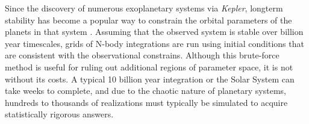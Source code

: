 \documentclass[12pt,letter]{aastex}
\newcommand{\kep}{{\it Kepler}\xspace}
\begin{document}
Since the discovery of numerous exoplanetary systems via \kep, longterm stability has become a popular way to constrain the orbital parameters of the planets in that system \citep{Lissauer2011, Steffen2013, Jontof-Hutter2014, Tamayo2015}. 
Assuming that the observed system is stable over billion year timescales, grids of N-body integrations are run using initial conditions that are consistent with the observational constrains. 
Although this brute-force method is useful for ruling out additional regions of parameter space, it is not without its costs. 
A typical 10 billion year integration or the Solar System can take weeks to complete, and due to the chaotic nature of planetary systems, hundreds to thousands of realizations must typically be simulated to acquire statistically rigorous answers. 



\end{document}
